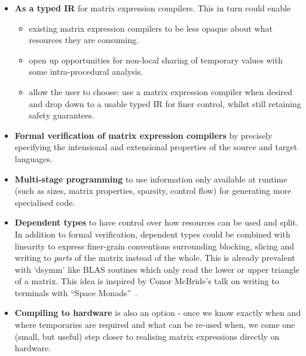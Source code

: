 \begin{itemize}

    \item \textbf{As a typed IR} for matrix expression compilers. This in turn
        could enable
        \begin{itemize}
            \item existing matrix expression compilers to be less opaque about
                what resources they are consuming.
            \item open up opportunities for non-local sharing of temporary values
                with some intra-procedural analysis.
            \item allow the user to choose: use a matrix expression compiler when
                desired and drop down to a usable typed IR for finer control,
                whilst still retaining safety guarantees.
        \end{itemize}

    \item \textbf{Formal verification of matrix expression compilers} by
        precisely specifying the intensional and extensional properties of the
        source and target languages.

    \item \textbf{Multi-stage programming} to use information only available at
        runtime (such as sizes, matrix properties, sparsity, control flow) for
        generating more specialised code.

    \item \textbf{Dependent types} to have control over how resources can be
        used and split. In addition to formal verification, dependent types
        could be combined with linearity to express finer-grain conventions
        surrounding blocking, slicing and writing to \emph{parts} of the matrix
        instead of the whole. This is already prevalent with `dsymm' like BLAS
        routines which only read the lower or upper triangle of a matrix.  This
        idea is inspired by Conor McBride's talk on writing to
        terminals with ``Space Monads''~\cite{space_monads}.

    \item \textbf{Compiling to hardware} is also an option - once we know
        exactly when and where temporaries are required and what can be re-used
        when, we come one (small, but useful) step closer to realising matrix
        expressions directly on hardware.

\end{itemize}


